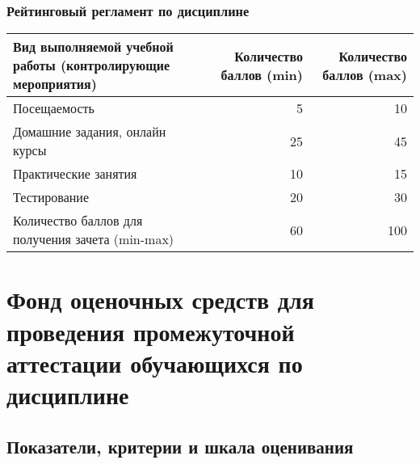 \documentclass[a4paper,12pt]{article}
\begin{document}
\subsubsection*{Рейтинговый регламент по дисциплине}
\begin{longtable}{|>{\raggedright\arraybackslash}p{110mm}|r|r|}
\hline
\centering\arraybackslash Вид выполняемой учебной работы (контролирующие мероприятия) & 
\multicolumn{1}{p{20mm}|}{\centering\arraybackslash Количество баллов (min)} & 
\multicolumn{1}{p{20mm}|}{\centering\arraybackslash Количество баллов (max)} \\
\hline
Посещаемость & 5 & 10 \\ 
\hline
Домашние задания, онлайн курсы & 25 & 45 \\ 
\hline
Практические занятия & 10 & 15 \\ 
\hline
Тестирование & 20 & 30 \\ 
\hline
Количество баллов для получения зачета (min-max) & 60 & 100 \\ 

\hline
\end{longtable}

\section{Фонд оценочных средств для проведения промежуточной аттестации обучающихся по дисциплине}

\subsection{Показатели, критерии и шкала оценивания}
\end{document}
